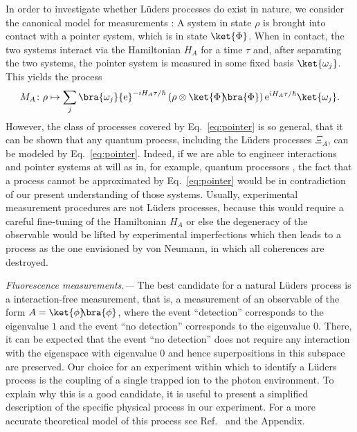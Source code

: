 \documentclass[
aps,prl,
reprint,
a4paper,
superscriptaddress,
floatfix,
]{revtex4-1}
\newcommand{\ee}{{\mathrm e}}
\newcommand{\ketbra}[2]{{\ket{#1}\!\!\bra{#2}}}
\newcommand{\proj}[1]{{\ketbra{#1}{#1}}}
\begin{document}
In order to investigate whether Lüders processes do exist in nature, we 
 consider the canonical model for measurements \cite{Peres95, Heinosaari12}:
A system in state $\rho$ is brought into contact with a pointer 
 system, which is in state $\ket{\Phi}$.
When in contact, the two systems interact via the Hamiltonian $H_A$ for a time 
 $\tau$ and, after separating the two systems, the pointer system is measured 
 in some fixed basis $\ket{\omega_j}$.
This yields the process
%
\begin{equation}\label{eq:pointer}
 M_A\colon \rho\mapsto
 \sum_j \bra{\omega_j}\ee^{-i H_A\tau/\hbar} \left(\rho\otimes \proj\Phi\right)
 \ee^{i H_A\tau/\hbar}\ket{\omega_j}.
\end{equation}
%
However, the class of processes covered by Eq.~\eqref{eq:pointer} is so 
 general, that it can be shown \cite{Heinosaari12} that any quantum process, 
 including the Lüders processes $\Xi_A$, can be modeled by 
 Eq.~\eqref{eq:pointer}.
Indeed, if we are able to engineer interactions and pointer systems at will as 
 in, for example, quantum processors \cite{Deutsch85, Barenco95}, the 
 fact that a process cannot be approximated by Eq.~\eqref{eq:pointer} would be 
 in contradiction of our present understanding of those systems.
Usually, experimental measurement procedures are not Lüders processes, because 
 this would require a careful fine-tuning of the Hamiltonian $H_A$ or else the degeneracy of the observable would be lifted by experimental 
 imperfections which then leads to a process as the one envisioned by von 
 Neumann, in which all coherences are destroyed.

{\em Fluorescence measurements.---}%
The best candidate for a natural Lüders process is a interaction-free measurement, that 
 is, a measurement of an observable of the form $A= \proj{\phi}$, where the 
 event ``detection'' corresponds to the eigenvalue $1$ and the event ``no 
 detection'' corresponds to the eigenvalue $0$.
There, it can be expected that the event ``no detection'' does not require any 
 interaction with the eigenspace with eigenvalue $0$ and hence superpositions 
 in this subspace are preserved.
Our choice for an experiment within which to identify a Lüders process is the coupling
 of a single trapped ion to the photon environment.
To explain why this is a good candidate, it is useful to present a simplified 
 description of the specific physical process in our experiment.
 For a more 
 accurate theoretical model of this process see Ref.~\cite{Carmichael93} and 
 the Appendix.
\end{document}
